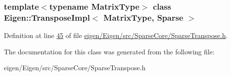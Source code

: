 \subsubsection*{template$<$typename Matrix\+Type$>$\newline
class Eigen\+::\+Transpose\+Impl$<$ Matrix\+Type, Sparse $>$}



Definition at line \hyperlink{eigen_2_eigen_2src_2_sparse_core_2_sparse_transpose_8h_source_l00045}{45} of file \hyperlink{eigen_2_eigen_2src_2_sparse_core_2_sparse_transpose_8h_source}{eigen/\+Eigen/src/\+Sparse\+Core/\+Sparse\+Transpose.\+h}.



The documentation for this class was generated from the following file\+:\begin{DoxyCompactItemize}
\item 
eigen/\+Eigen/src/\+Sparse\+Core/\+Sparse\+Transpose.\+h\end{DoxyCompactItemize}
